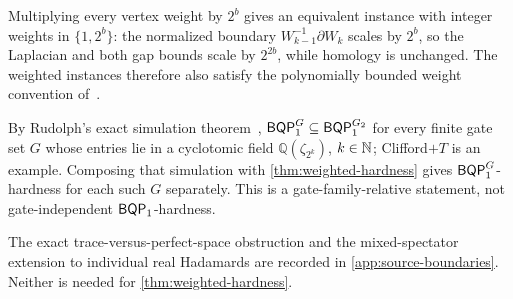 \begin{remark}
\label{rem:integer-weights}
Multiplying every vertex weight by \(2^{b}\) gives an equivalent instance
with integer weights in \(\{1,2^{b}\}\): the normalized boundary
\(W_{k-1}^{-1}\partial W_k\) scales by \(2^{b}\), so the Laplacian and both
gap bounds scale by \(2^{2b}\), while homology is unchanged.  The weighted
instances therefore also satisfy the polynomially bounded weight convention
of~\cite{lowe2026normalized}.
\end{remark}

\begin{remark}
\label{rem:gate-sets}
By Rudolph's exact simulation theorem~\cite[Theorem~3.4]{rudolph2026universal},
\(\mathsf{BQP}_{1}^{G}\subseteq\mathsf{BQP}_{1}^{G_2}\) for every finite gate set \(G\) whose
entries lie in a cyclotomic field \(\mathbb Q(\zeta_{2^k})\), \(k\in\mathbb{N}\);
Clifford\(+T\) is an example.  Composing that simulation with
\cref{thm:weighted-hardness} gives \(\mathsf{BQP}_{1}^{G}\)-hardness for each such
\(G\) separately.  This is a gate-family-relative statement, not
gate-independent \(\mathsf{BQP}_{1}\)-hardness.
\end{remark}

The exact trace-versus-perfect-space obstruction and the mixed-spectator
extension to individual real Hadamards are recorded in
\cref{app:source-boundaries}.  Neither is needed for
\cref{thm:weighted-hardness}.
